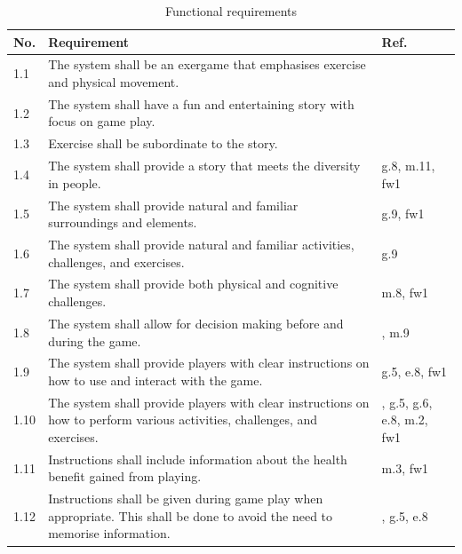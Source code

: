 \begin{table} [H]
\centering
\begin{tabular}{|>{\raggedright}p{}|p{}|p{}|}
\hline
\textbf{No.} & \textbf{Requirement} &  \textbf{Ref.}\\ \hline
1.1 & The system shall be an exergame that emphasises exercise and physical movement. & \cite{project} \\ \hline
1.2 & The system shall have a fun and entertaining story with focus on game play.  & \cite{project} \cite{zyda2005visual} \\ \hline
1.3 & Exercise shall be subordinate to the story. & \cite{zyda2005visual} \\ \hline
1.4 & The system shall provide a story that meets the diversity in people. & g.8, m.11, fw1 \\ \hline
1.5 & The system shall provide natural and familiar surroundings and elements. & g.9, fw1\\ \hline
1.6 & The system shall provide natural and familiar activities, challenges, and exercises. & g.9 \\ \hline
1.7 & The system shall provide both physical and cognitive challenges. & m.8, fw1 \\ \hline
1.8 & The system shall allow for decision making before and during the game. & \cite{understandingvg}, m.9 \\ \hline
1.9 & The system shall provide players with clear instructions on how to use and interact with the game. & g.5, e.8, fw1 \\ \hline
1.10 & The system shall provide players with clear instructions on how to perform various activities, challenges, and exercises. & \cite{sweetser}, g.5, g.6, e.8, m.2, fw1\\ \hline
1.11 & Instructions shall include information about the health benefit gained from playing. & m.3, fw1\\ \hline
1.12 & Instructions shall be given during game play when appropriate. This shall be done to avoid the need to memorise information. & \cite{sweetser}, g.5, e.8 \\ \hline
    \end{tabular}
    \caption[Functional requirements, part 1]{Functional requirements}
    \label{tab:func1}
\end{table} 

